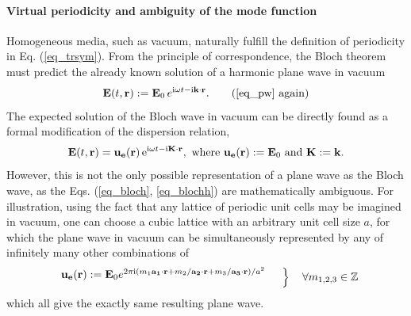 \paragraph{Virtual periodicity and ambiguity of the mode function}%
Homogeneous media, such as vacuum, naturally fulfill the definition of periodicity in Eq. (\ref{eq_trsym}).
From the principle of correspondence, the Bloch theorem must predict
the already known solution of a harmonic plane wave in vacuum
\begin{equation} \E(t, \rr) := \E_0\, e^{\ii\omega t - \ii\kk\cdot\rr}. \tag{\ref{eq_pw} \again} \end{equation}
The expected solution of the Bloch wave in vacuum can be directly found as a formal modification of the dispersion relation,
\begin{equation}  
\mathbf{E}(t, {\mathbf{r}}) = \mathbf{u_e}({\mathbf{r}})\,\mathrm{e}^{{\mathrm i}\omega t - {\mathrm i}{\mathbf{K}}\cdot{\mathbf{r}}}, \text{ where } \mathbf{u_e}({\mathbf{r}}) := \mathbf{E}_0  \text{ and } {\mathbf{K}} := {\mathbf{k}}.
\label{eq_blochvac}
\end{equation}
However, this is not the only possible representation of a plane wave as the Bloch wave, as the Eqs. (\ref{eq_bloch}, \ref{eq_blochh}) are mathematically ambiguous. 
For illustration, using the fact that any lattice of periodic unit cells may be imagined in vacuum, one can choose a cubic lattice with an arbitrary unit cell size $a$, %
for which the plane wave in vacuum can be simultaneously represented by any of infinitely many other combinations of
\begin{equation} 
\left.  \begin{array}{cc}
	\mathbf{u_{e}}(\rr) := \E_0 e^{2\pi\ii (m_1\ava\cdot\rr + m_2/\avb\cdot\rr + m_3/\avc\cdot\rr)/a^{2}} \vspace{2mm} \\ %
\end{array}\quad \right\} \quad \forall m_{1,2,3} \in \mathbb{Z}
\label{eq_blochvac2}
\end{equation}
which all 
give the exactly same resulting plane wave. 

